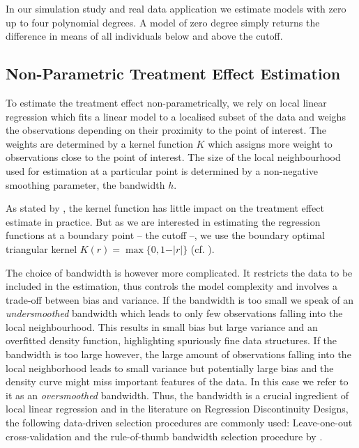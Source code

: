 \documentclass[11pt, a4paper, leqno]{article}
\numberwithin{equation}{section}
\numberwithin{figure}{section}
\numberwithin{table}{section}
\numberwithin{algorithm}{section}
\begin{document}
In our simulation study and real data application we estimate models with zero up to four polynomial degrees. A model of zero degree simply returns the difference in means of all individuals below and above the cutoff.


\subsection{Non-Parametric Treatment Effect Estimation} %
\label{sec: non-param}
To estimate the treatment effect non-parametrically, we rely on local linear regression which fits a linear model to a localised subset of the data and weighs the observations depending on their proximity to the point of interest. The weights are determined by a kernel function $K$ which assigns more weight to observations close to the point of interest. The size of the local neighbourhood used for estimation at a particular point is determined by a non-negative smoothing parameter, the bandwidth $h$.

As stated by \cite{lee_lemieux}, the kernel function has little impact on the treatment effect estimate in practice. But as we are interested in estimating the regression functions at a boundary point -- the cutoff --, we use the boundary optimal triangular kernel $K(r) = \max \lbrace 0, 1 - \vert r \vert \rbrace$ (cf. \cite{cheng_et_al}).

The choice of bandwidth is however more complicated. It restricts the data to be included in the estimation, thus controls the model complexity and involves a trade-off between bias and variance. If the bandwidth is too small we speak of an \textit{undersmoothed} bandwidth which leads to only few observations falling into the local neighbourhood. This results in small bias but large variance and an overfitted density function, highlighting spuriously fine data structures. If the bandwidth is too large however, the large amount of observations falling into the local neighborhood leads to small variance but potentially large bias and the density curve might miss important features of the data. In this case we refer to it as an \textit{oversmoothed} bandwidth. Thus, the bandwidth is a crucial ingredient of local linear regression and in the literature on Regression Discontinuity Designs, the following data-driven selection procedures are commonly used: Leave-one-out cross-validation and the rule-of-thumb bandwidth selection procedure by \cite{fan_gij}.
\end{document}
